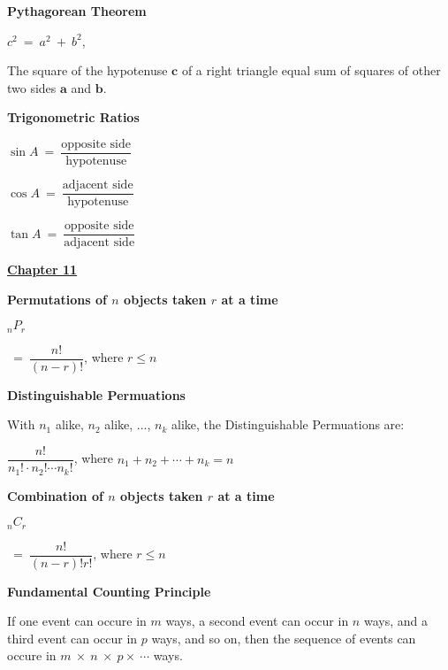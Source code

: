 \documentclass{article}
\begin{document}
\begin{large}
\textbf{Pythagorean Theorem}

\hspace{2.7in} $c^{2}\ =\ a^{2}\ +\ b^{2}$,

\begin{large}The square of the hypotenuse $\textbf{c}$ of a right triangle equal sum of squares of other two sides $\textbf{a}$ and $\textbf{b}$.\end{large}

\textbf{Trigonometric Ratios}

\hspace{0.1in} $\sin A\ =\ \dfrac{\text{opposite side}}{\text{hypotenuse}}$

\hspace{0.1in} $\cos A\ =\ \dfrac{\text{adjacent side}}{\text{hypotenuse}}$

\hspace{0.1in} $\tan A\ =\ \dfrac{\text{opposite side}}{\text{adjacent side}}$

\vspace{0.5in}

\underline{\textbf{\huge Chapter 11 \phantom{ } \phantom{ } \phantom{ } \phantom{ }}}

\textbf{Permutations of $n$ objects taken $r$ at a time}

\hspace{2.0in} \begin{Large}$\phantom{ }_{n}P_{r}$\end{Large}$\ =\ \dfrac{n!}{(n-r)!}$, where $r \leq n$

\textbf{Distinguishable Permuations}

\hspace{0.5in} With $n_{1}$ alike, $n_{2}$ alike, ..., $n_{k}$ alike, the Distinguishable Permuations are:

\hspace{1.5in} $\dfrac{n!}{n_{1}!\cdot n_{2}!\cdots n_{k}!}$, where $n_{1} + n_{2} + \cdots + n_{k} = n$

\textbf{Combination of $n$ objects taken $r$ at a time}

\hspace{2.0in} \begin{Large}$\phantom{ }_{n}C_{r}$\end{Large}$\ =\ \dfrac{n!}{(n-r)!r!}$, where $r \leq n$

\textbf{Fundamental Counting Principle}

\hspace{0.1in} If one event can occure in $m$ ways, a second event can occur in $n$ ways, and a third event can occur in $p$ ways, and so on, then the sequence of events can occure in $m\ \times\ n\ \times\ p \times\ \cdots$ ways.


\end{large}
\end{document}
